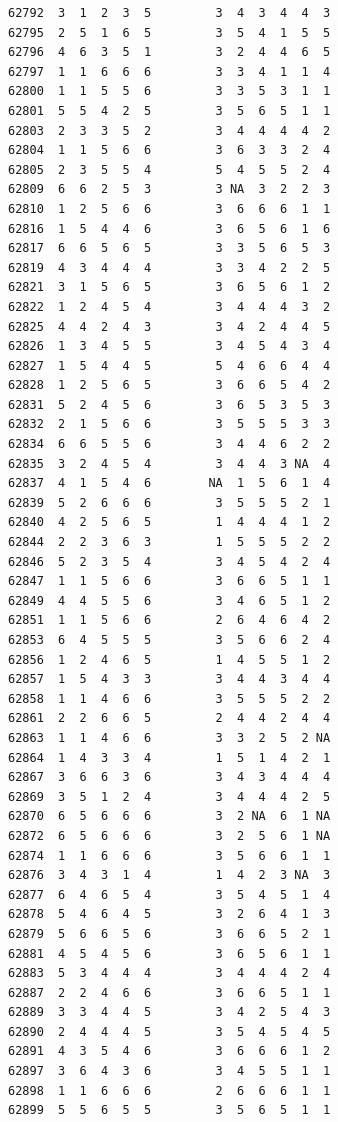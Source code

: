 \documentclass[
  letterpaper,
  DIV=11,
  numbers=noendperiod]{scrreprt}
\begin{document}
\begin{verbatim}
62792  3  1  2  3  5         3  4  3  4  4  3
62795  2  5  1  6  5         3  5  4  1  5  5
62796  4  6  3  5  1         3  2  4  4  6  5
62797  1  1  6  6  6         3  3  4  1  1  4
62800  1  1  5  5  6         3  3  5  3  1  1
62801  5  5  4  2  5         3  5  6  5  1  1
62803  2  3  3  5  2         3  4  4  4  4  2
62804  1  1  5  6  6         3  6  3  3  2  4
62805  2  3  5  5  4         5  4  5  5  2  4
62809  6  6  2  5  3         3 NA  3  2  2  3
62810  1  2  5  6  6         3  6  6  6  1  1
62816  1  5  4  4  6         3  6  5  6  1  6
62817  6  6  5  6  5         3  3  5  6  5  3
62819  4  3  4  4  4         3  3  4  2  2  5
62821  3  1  5  6  5         3  6  5  6  1  2
62822  1  2  4  5  4         3  4  4  4  3  2
62825  4  4  2  4  3         3  4  2  4  4  5
62826  1  3  4  5  5         3  4  5  4  3  4
62827  1  5  4  4  5         5  4  6  6  4  4
62828  1  2  5  6  5         3  6  6  5  4  2
62831  5  2  4  5  6         3  6  5  3  5  3
62832  2  1  5  6  6         3  5  5  5  3  3
62834  6  6  5  5  6         3  4  4  6  2  2
62835  3  2  4  5  4         3  4  4  3 NA  4
62837  4  1  5  4  6        NA  1  5  6  1  4
62839  5  2  6  6  6         3  5  5  5  2  1
62840  4  2  5  6  5         1  4  4  4  1  2
62844  2  2  3  6  3         1  5  5  5  2  2
62846  5  2  3  5  4         3  4  5  4  2  4
62847  1  1  5  6  6         3  6  6  5  1  1
62849  4  4  5  5  6         3  4  6  5  1  2
62851  1  1  5  6  6         2  6  4  6  4  2
62853  6  4  5  5  5         3  5  6  6  2  4
62856  1  2  4  6  5         1  4  5  5  1  2
62857  1  5  4  3  3         3  4  4  3  4  4
62858  1  1  4  6  6         3  5  5  5  2  2
62861  2  2  6  6  5         2  4  4  2  4  4
62863  1  1  4  6  6         3  3  2  5  2 NA
62864  1  4  3  3  4         1  5  1  4  2  1
62867  3  6  6  3  6         3  4  3  4  4  4
62869  3  5  1  2  4         3  4  4  4  2  5
62870  6  5  6  6  6         3  2 NA  6  1 NA
62872  6  5  6  6  6         3  2  5  6  1 NA
62874  1  1  6  6  6         3  5  6  6  1  1
62876  3  4  3  1  4         1  4  2  3 NA  3
62877  6  4  6  5  4         3  5  4  5  1  4
62878  5  4  6  4  5         3  2  6  4  1  3
62879  5  6  6  5  6         3  6  6  5  2  1
62881  4  5  4  5  6         3  6  5  6  1  1
62883  5  3  4  4  4         3  4  4  4  2  4
62887  2  2  4  6  6         3  6  6  5  1  1
62889  3  3  4  4  5         3  4  2  5  4  3
62890  2  4  4  4  5         3  5  4  5  4  5
62891  4  3  5  4  6         3  6  6  6  1  2
62897  3  6  4  3  6         3  4  5  5  1  1
62898  1  1  6  6  6         2  6  6  6  1  1
62899  5  5  6  5  5         3  5  6  5  1  1

\end{verbatim}
\end{document}
